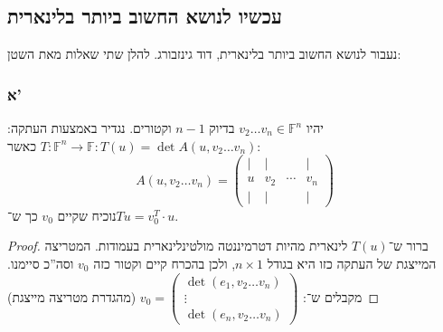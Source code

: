 \documentclass[]{article}
\newcommand\F         {\mathbb{F}}
\newcommand\co        {\colon}
\newcommand\pms[1]    {\begin{pmatrix}
		#1
\end{pmatrix}}
\theoremstyle{definition}
\begin{document}
	\subsection*{עכשיו לנושא החשוב ביותר בלינארית}
	נעבור לנושא החשוב ביותר בלינארית, דוד גינזבורג. להלן שתי שאלות מאת השטן: 
	\subsubsection*{א'}
	יהיו $v_2 \dots v_n \in \F^n$ בדיוק $n - 1$ וקטורים. נגדיר באמצעות העתקה: 
	$T \co \F^n \to \F \co T(u) = \det A(u, v_2 \dots v_n)$
	כאשר: 
	\[ A(u, v_2 \dots v_n) = \pms{\vert & \vert && \vert \\ u & v_2 & \cdots & v_n \\ \vert & \vert & & \vert} \]
	נוכיח שקיים $v_0$ כך ש־$Tu = v_0^T \cdot u$. 
	\begin{proof}
		ברור ש־$T(u)$ לינארית מהיות דטרמיננטה מולטינלינארית בעמודות. המטריצה המייצגת של העתקה כזו היא בגודל $n \times 1$, ולכן בהכרח קיים וקטור כזה $v_0$ וסה''כ סיימנו. מקבלים ש־: 
		$v_0 = \pms{\det(e_1, v_2 \dots v_n) \\ \vdots \\ \det(e_n, v_2 \dots v_n)}$
		(מהגדרת מטריצה מייצגת)
	\end{proof}
	
	
\end{document}
